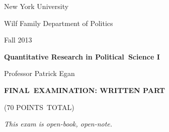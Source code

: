 \documentclass[11pt]{article}
\begin{document}
New York University

Wilf Family Department of Politics

Fall 2013\bigskip 

\begin{center}
{\large \textbf{Quantitative Research in Political\ Science I}}

Professor Patrick Egan

\bigskip
\end{center}

\bigskip

\begin{center}
\textbf{FINAL\ EXAMINATION: WRITTEN PART}

(70 POINTS\ TOTAL)\textbf{\bigskip }

\textit{This exam is open-book, open-note.}

\bigskip

\bigskip

\newpage

\bigskip
\end{center}
\end{document}
